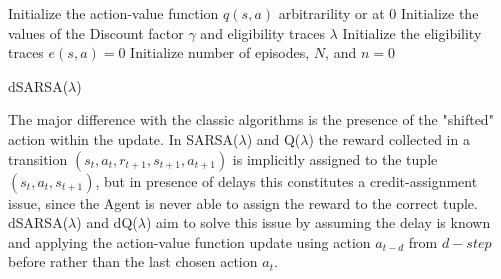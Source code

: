                 \begin{algorithm}[t]
                    \SetAlgoLined
                    Initialize the action-value function $q(s,a)$ arbitrarility or at 0\;
                    Initialize the values of the Discount factor $\gamma$ and eligibility traces $\lambda$\;
                    Initialize the eligibility traces $e(s,a)=0$\;
                    Initialize number of episodes, $N$, and $n=0$\;
                    \caption{dSARSA($\lambda$)}
                    \label{algo:dsarsalambda}
                \end{algorithm}                
                \noindent
                The major difference with the classic algorithms is the presence of the "shifted" action within the update. In SARSA($\lambda$) and Q($\lambda$) the reward collected in a transition $(s_t, a_t, r_{t+1}, s_{t+1}, a_{t+1})$ is implicitly assigned to the tuple $(s_t, a_t, s_{t+1})$, but in presence of delays this constitutes a credit-assignment issue, since the Agent is never able to assign the reward to the correct tuple. dSARSA($\lambda$) and dQ($\lambda$) aim to solve this issue by assuming the delay is known and applying the action-value function update using action $a_{t-d}$ from $d-step$ before rather than the last chosen action $a_t$.\newline
